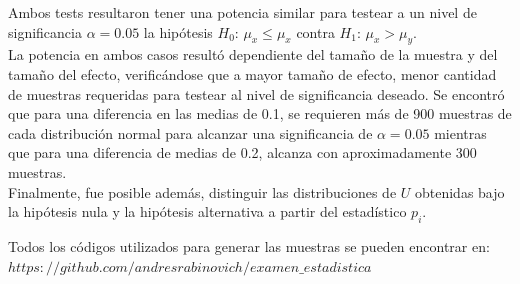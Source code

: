 \documentclass[%
 reprint,
 amsmath,amssymb,
 aps,
spanish]{revtex4-1}
\begin{document}
Ambos tests resultaron tener una potencia similar para testear a un nivel de significancia $\alpha=0.05$ la hipótesis $H_0$: $\mu_x \leq \mu_x$ contra $H_1$: $\mu_x > \mu_y$.\\
La potencia en ambos casos resultó dependiente del tamaño de la muestra y del tamaño del efecto, verificándose que a mayor tamaño de efecto, menor cantidad de muestras requeridas para testear al 
nivel de significancia deseado. Se encontró que para una diferencia en las medias de 0.1, se requieren más de 900 muestras de cada distribución normal para alcanzar una significancia de $\alpha=0.05$ 
mientras que para una diferencia de medias de 0.2, alcanza con aproximadamente 300 muestras.\\
Finalmente, fue posible además, distinguir las distribuciones de $U$ obtenidas bajo la hipótesis nula y la hipótesis alternativa a partir del estadístico $p_i$.

\appendix
Todos los códigos utilizados para generar las muestras se pueden encontrar en:\\
$https://github.com/andresrabinovich/examen\_estadistica$
\end{document}
